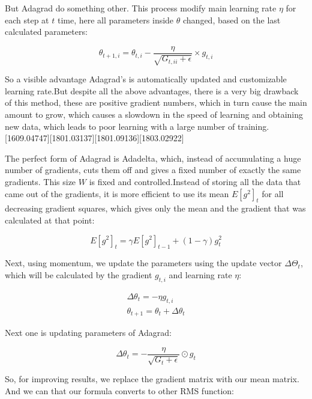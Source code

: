 \noindent But Adagrad do something other. This process modify main learning rate $\eta$ for each step at $t$ time, here all parameters inside $\theta$ changed, based on the last calculated parameters:

\begin{equation}
	\theta_{t+1, i} = \theta_{t,i} - \dfrac{\eta}{\sqrt{G_{t,ii}+\epsilon}}\times g_{t,i}
\end{equation}

\noindent So a visible advantage Adagrad's is automatically updated and customizable learning rate.But despite all the above advantages, there is a very big drawback of this method, these are positive gradient numbers, which in turn cause the main amount to grow, which causes a slowdown in the speed of learning and obtaining new data, which leads to poor learning with a large number of training.[1609.04747][1801.03137][1801.09136][1803.02922]

\noindent The perfect form of Adagrad is Adadelta, which, instead of accumulating a huge number of gradients, cuts them off and gives a fixed number of exactly the same gradients. This size $W$ is fixed and controlled.Instead of storing all the data that came out of the gradients, it is more efficient to use its mean $E[g^2]_t$ for all decreasing gradient squares, which gives only the mean and the gradient that was calculated at that point:
 
 
\begin{equation}
	E[g^2]_t = \gamma E[g^2]_{t-1} + (1 - \gamma) g^2_t
\end{equation}

\noindent Next, using momentum, we update the parameters using the update vector $\Delta\Theta_t$, which will be calculated by the gradient $g_{t,i}$ and learning rate $\eta$:

\begin{equation}
	\begin{split}
	\Delta\theta_t = - \eta g_{t,i} \\
	\theta_{t+1} = \theta_t + \Delta\theta_t
	\end{split}
\end{equation}

\noindent Next one is updating parameters of Adagrad:

\begin{equation}
	\Delta\theta_t = - \dfrac{\eta}{\sqrt{G_t+ \epsilon} } \odot g_t
\end{equation}


\noindent So, for improving results, we replace the gradient matrix with our mean matrix. And we can that our formula converts to other RMS function:

